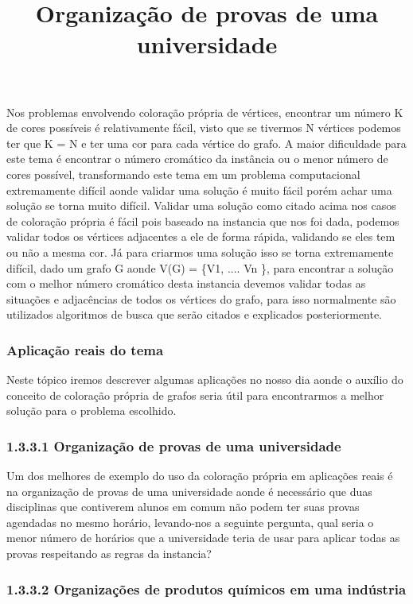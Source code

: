 \documentclass[12pt]{article}
\begin{document}
   	Nos problemas envolvendo coloração própria de vértices, encontrar um número K de cores possíveis é relativamente fácil, visto que se tivermos N vértices podemos ter que K = N e ter uma cor para cada vértice do grafo. A maior dificuldade para este tema é encontrar o número cromático da instância ou o menor número de cores possível, transformando este tema em um problema computacional extremamente difícil aonde validar uma solução é muito fácil porém achar uma solução se torna muito difícil.
   	Validar uma solução como citado acima nos casos de coloração própria é fácil pois baseado na instancia que nos foi dada, podemos validar todos os vértices adjacentes a ele de forma rápida, validando se eles tem ou não a mesma cor. Já para criarmos uma solução isso se torna extremamente difícil, dado um grafo G aonde V(G) = \{V1, .... Vn \}, para encontrar a solução com o melhor número cromático desta instancia devemos validar todas as situações e adjacências de todos os vértices do grafo, para isso normalmente são utilizados algoritmos de busca que serão citados e explicados posteriormente.
   	
   	\subsubsection{Aplicação reais do tema}
   	
   	Neste tópico iremos descrever algumas aplicações no nosso dia aonde o auxílio do conceito de coloração própria de grafos seria útil para encontrarmos a melhor solução para o problema escolhido.
   	
   \title{Organização de provas de uma universidade}
   
   \subsubsection*{1.3.3.1 Organização de provas de uma universidade}
  
   Um dos melhores de exemplo do uso da coloração própria em aplicações reais é na organização de provas de uma universidade aonde é necessário que duas disciplinas que contiverem alunos em comum não podem ter suas provas agendadas no mesmo horário, levando-nos a seguinte pergunta, qual seria o menor número de horários que a universidade teria de usar para aplicar todas as provas respeitando as regras da instancia?
   
   
   \subsubsection*{   1.3.3.2 Organizações de produtos químicos em uma indústria}
  
\end{document}
